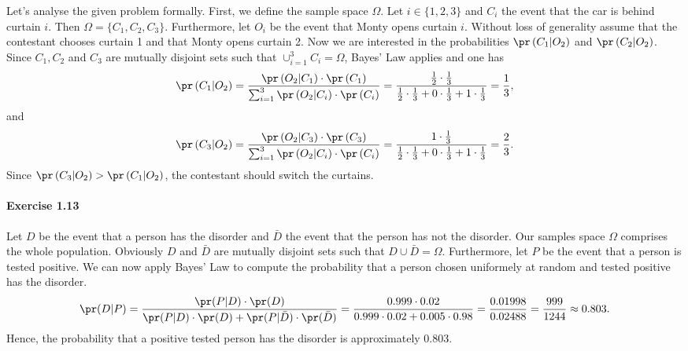 Let's analyse the given problem formally. First, we define the sample space $\Omega$.
Let $i \in \{ 1, 2, 3 \}$ and $C_i$ the event that the car is behind curtain $i$.
Then $\Omega = \{ C_1, C_2, C_3 \}$. Furthermore, let $O_i$ be the event that Monty
opens curtain $i$. Without loss of generality assume that the contestant chooses
curtain 1 and that Monty opens curtain 2. Now we are interested in the probabilities
$\pr\left(C_1 | O_2\right)$ and $\pr\left(C_2 | O_2\right)$. Since $C_1, C_2$ and
$C_3$ are mutually disjoint sets such that $\cup_{i=1}^3 C_i = \Omega$, Bayes' Law
applies and one has
\[
  \pr\left(C_1 | O_2\right)
    = \frac {\pr\left(O_2 | C_1\right) \cdot \pr\left(C_1 \right)} {\sum_{i=1}^3 \pr\left(O_2 | C_i\right) \cdot \pr\left(C_i\right)}
    = \frac {\frac{1}{2} \cdot \frac{1}{3}}{\frac{1}{2} \cdot \frac{1}{3} + 0 \cdot \frac{1}{3} + 1 \cdot \frac{1}{3}}
    = \frac{1}{3},
\]
and
\[
  \pr\left(C_3 | O_2\right)
    = \frac {\pr\left(O_2 | C_3\right) \cdot \pr\left(C_3 \right)}{\sum_{i=1}^3 \pr\left(O_2 | C_i\right) \cdot \pr\left(C_i\right)}
    = \frac {1 \cdot \frac{1}{3}}{\frac{1}{2} \cdot \frac{1}{3} + 0 \cdot \frac{1}{3} + 1 \cdot \frac{1}{3}}
    = \frac{2}{3}.
\]
Since $\pr\left(C_3 | O_2\right) > \pr\left(C_1 | O_2\right)$, the contestant
should switch the curtains.

\paragraph{Exercise 1.13}  Let $D$ be the event that a person has the disorder and
$\bar{D}$ the event that the person has not the disorder. Our samples space $\Omega$
comprises the whole population. Obviously $D$ and $\bar{D}$ are mutually disjoint
sets such that $D \cup \bar{D} = \Omega$. Furthermore, let $P$ be the event that
a person is tested positive. We can now apply Bayes' Law to compute the probability
that a person chosen uniformely at random and tested positive has the disorder.
\[
  \pr(D|P)
    = \frac{\pr(P|D) \cdot \pr(D)}{\pr(P|D) \cdot \pr(D) + \pr(P|\bar{D}) \cdot \pr(\bar{D})}
    = \frac{0.999 \cdot 0.02}{0.999 \cdot 0.02 + 0.005 \cdot 0.98}
    = \frac{0.01998}{0.02488}
    = \frac{999}{1244}
    \approx 0.803.
\]
Hence, the probability that a positive tested person has the disorder is
approximately 0.803.


